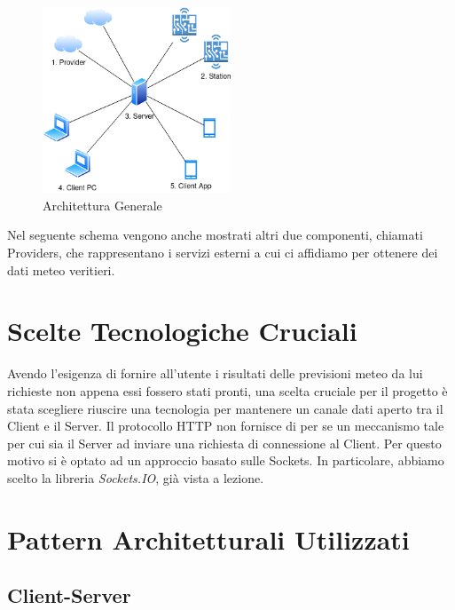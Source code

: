     \begin{figure}[H]
        \caption{Architettura Generale}
        \label{fig:General}
        \centering
        \includegraphics[width=0.5\textwidth]{DrawIo/General.png}
    \end{figure}
    
    \par Nel seguente schema vengono anche mostrati altri due componenti, chiamati Providers, che rappresentano i servizi esterni a cui ci affidiamo per ottenere dei dati meteo veritieri.
    
    \section{Scelte Tecnologiche Cruciali}
    
    Avendo l'esigenza di fornire all'utente i risultati delle previsioni meteo da lui richieste non appena essi fossero stati pronti, una scelta cruciale per il progetto è stata scegliere riuscire una tecnologia per mantenere un canale dati aperto tra il Client e il Server. Il protocollo HTTP non fornisce di per se un meccanismo tale per cui sia il Server ad inviare una richiesta di connessione al Client. Per questo motivo si è optato ad un approccio basato sulle Sockets. In particolare, abbiamo scelto la libreria \textit{Sockets.IO}, già vista a lezione.

    \section{Pattern Architetturali Utilizzati}
    
        
    
        \subsection{Client-Server}
        
